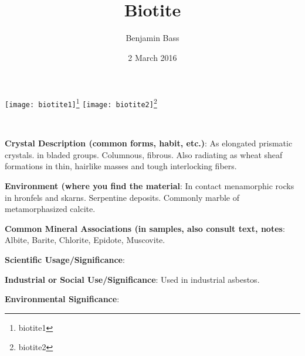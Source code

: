 \documentclass[10pt]{article}
\author{Benjamin Bass}
\date{2 March 2016}
\title{\vspace{-2.0cm}Biotite} %
\begin{document}
\maketitle


\begin{center}
  \texttt{[image: biotite1]}\footnote{biotite1}
  \texttt{[image: biotite2]}\footnote{biotite2}
\end{center}



\
\
\
\
\
\
\
\
\
\

\begin{framed}
  \textbf{Crystal Description (common forms, habit, etc.)}: As elongated prismatic crystals. in bladed groups. Columnous, fibrous. Also radiating as wheat sheaf formations in thin, hairlike masses and tough interlocking fibers.
\end{framed}

\begin{framed}
  \textbf{Environment (where you find the material}: In contact menamorphic rocks in hronfels and skarns. Serpentine deposits. Commonly marble of metamorphasized calcite.
\end{framed}

\begin{framed}
  \textbf{Common Mineral Associations (in samples, also consult text, notes}: Albite, Barite, Chlorite, Epidote, Muscovite.
\end{framed}

\begin{framed}
  \textbf{Scientific Usage/Significance}: 
\end{framed}

\begin{framed}
  \textbf{Industrial or Social Use/Significance}: Used in industrial asbestos.
\end{framed}

\begin{framed}
  \textbf{Environmental Significance}: 
\end{framed}

\end{document}
